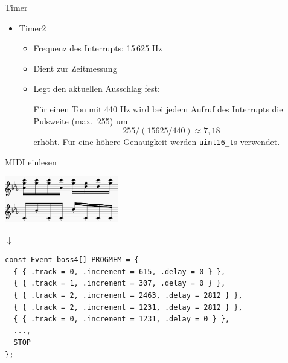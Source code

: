 \documentclass[fleqn]{beamer}
\begin{document}
    \begin{frame}{Timer}
    		\begin{itemize}
    			\item Timer2
	    		\begin{itemize}
	    			\item Frequenz des Interrupts: 15\,625 Hz
	    			\item Dient zur Zeitmessung
	    			\item Legt den aktuellen Ausschlag fest:
	    				
	    				Für einen Ton mit 440 Hz wird bei jedem Aufruf des Interrupts die Pulsweite (max.\ 255) um 
	    				\[255 / (15625/440) \approx 7,18\]
	    				erhöht. 
	    				Für eine höhere Genauigkeit werden \texttt{uint16_t}s verwendet.
	    		\end{itemize}
    		\end{itemize}
    		
    \end{frame}
    
    \begin{frame}[fragile]{MIDI einlesen}
    \begin{center}
        \includegraphics[height=2cm]{Bilder/noten.png}
        
        \huge$\downarrow$
        
        \begin{verbatim}
const Event boss4[] PROGMEM = {
  { { .track = 0, .increment = 615, .delay = 0 } },
  { { .track = 1, .increment = 307, .delay = 0 } },
  { { .track = 2, .increment = 2463, .delay = 2812 } },
  { { .track = 2, .increment = 1231, .delay = 2812 } },
  { { .track = 0, .increment = 1231, .delay = 0 } },
  ...,
  STOP
};
        \end{verbatim}
    \end{center}
    \end{frame}
\end{document}
